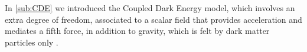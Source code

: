%
In \cref{sub:CDE} we introduced the Coupled Dark Energy model, 
which involves an extra degree of freedom, associated to a scalar field that
provides acceleration and mediates a fifth force, in addition to gravity,
which is felt by dark matter particles only \citep{Wetterich_1995, Amendola_2000,Amendola_2004,pettorino_baccigalupi_2008}.

